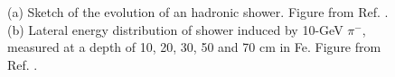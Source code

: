 \begin{figure}[ht]
\centering
{}
\caption{(a) Sketch of the evolution of an hadronic shower. Figure from Ref. \cite{grupen_shwartz_2008}. (b) Lateral energy distribution of shower induced by 10-GeV $\pi^-$, measured at a depth of 10, 20, 30, 50 and 70 cm in Fe. Figure from Ref. \cite{FRIEND1976505}.}
\label{fig:det:shower_had}
\end{figure}


